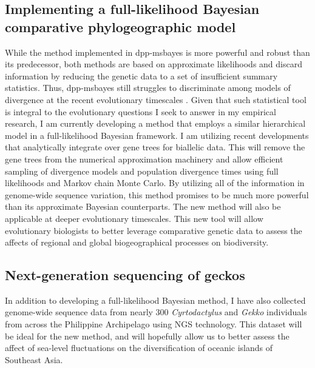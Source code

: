 \documentclass[10pt]{article}
\begin{document}
\subsection*{Implementing a full-likelihood Bayesian comparative
    phylogeographic model}
While the method implemented in dpp-msbayes is more powerful and robust than
its predecessor, both methods are based on approximate likelihoods and discard
information by reducing the genetic data to a set of insufficient summary
statistics.
Thus, dpp-msbayes still struggles to discriminate among models of divergence at
the recent evolutionary timescales .
Given that such statistical tool is integral to the evolutionary questions
I seek to answer in my empirical research,
I am currently developing a method that employs a similar hierarchical model in
a full-likelihood Bayesian framework.
I am utilizing recent developments that analytically integrate over gene trees
for biallelic data.
This will remove the gene trees from the numerical approximation machinery and
allow efficient sampling of divergence models and population divergence times
using full likelihoods and Markov chain Monte Carlo.
By utilizing all of the information in genome-wide sequence variation, this
method promises to be much more powerful than its approximate Bayesian
counterparts.
The new method will also be applicable at deeper evolutionary timescales.
This new tool will allow evolutionary biologists to better leverage comparative
genetic data to assess the affects of regional and global biogeographical
processes on biodiversity.

\subsection*{Next-generation sequencing of geckos}
In addition to developing a full-likelihood Bayesian method, I have also
collected genome-wide sequence data from nearly 300 \emph{Cyrtodactylus} and
\emph{Gekko} individuals from across the Philippine Archipelago using
NGS technology.
This dataset will be ideal for the new method, and will hopefully allow
us to better assess the affect of sea-level fluctuations on the
diversification of oceanic islands of Southeast Asia.
\end{document}
